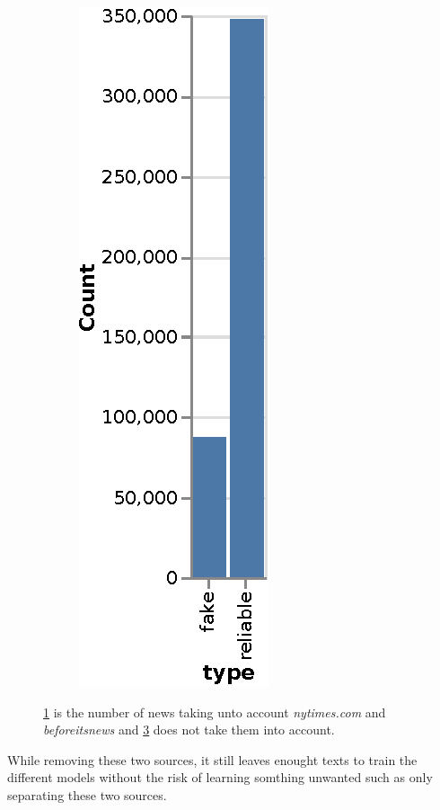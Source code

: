 \begin{figure}[h]
\begin{subfigure}[b]{0.4\textwidth}
     \caption{}
     \label{fig:data_explo:hist2}
   \end{subfigure}
  \hfill
  \begin{subfigure}[b]{0.4\textwidth}
     \centering
     \includegraphics[]{chapter/images/data_exploration/downsampled_news_count.eps}
     \caption{}
    \label{fig:data_explo:hist3}
   \end{subfigure}
   \caption{\ref{fig:data_explo:hist2} is the number of news taking unto account \textit{nytimes.com} and \textit{beforeitsnews} and \ref{fig:data_explo:hist3} does not take them into account.}
\end{figure}

While removing these two sources, it still leaves enought texts to train the different models without the risk of learning somthing unwanted such as only separating these two sources. 

